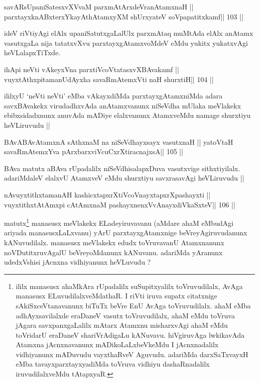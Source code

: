 \begin{shl}
savARsUpaniSatesxvXVvaM parxmAtArxdeVranAtamxnaH ||
parxtayxknABxterxYkayAthAtamxyXM shUrxyateV soVpapatitxkamf\hfill || 103 ||
\end{shl}

\begin{artha}
ideV riVtiyAgi elAlx upaniSatutxgaLalUlx parxmAtaq muMtAda elAlx anAtamx
vasutxgaLa nija tatatxvXvu parxtayxgAtamxvoMdeV eMdu yukitx yukatxvAgi heVLalapxTiTxde.
\end{artha}

\begin{shl}
ihApi neVti vAkeyxVna parxtiVcoV\s tatasxvXBAvakamf ||
vuyxtAthxpitamanUdAyx\s\s ha savaRmAtemxVti naH shurxtiH\hfill || 104 ||
\end{shl}

\begin{artha}
ililxyU `neVti neVti' eMba vAkayxdiMda parxtayxgAtamxniMda adara
savxBAvakekx virudadhxvAda anAtamxvanunx niSeVdha mUlaka meVlakekx
ebibxsidadxnunx anuvAda mADiye elalxvanunx AtamxveMdu namage shurxtiyu
heVLiruvudu ||
\end{artha}


\begin{shl}
BAvABAvAtamxnA sAthxnaM na niSeVdhayxsayx vasutxnaH ||
yatoV\s taH savaRmAtemxYva pArxbarxviVcuCxrXtiracnajxsA\hfill || 105 ||
\end{shl}

\begin{artha}
BAva matutx aBAva rUpadalilx niSeVdhisalapxDuva vasutxvige
sithxtiyilalx. adariMdaleV elalxvU AtamxveV eMdu shurxtiyu
savxrasavAgi heVLiruvudu ||
\end{artha}

\begin{shl}
nAvuyxtithxtamanAH kashicxtapxrXtiVcoV\s nayxtapxrXpashayxti ||
vuyxtithxtAtAmx\s pi cA\s\s tAmxnaM pashayxnenxVvAnayxdiVkaSxteV\hfill || 106 ||
\end{shl}

\begin{artha}
matutx\footnote[1]{ililx manasusx ahaMkAra rUpadalilx suSupitxyalilx
  toVruvudilalx, AvAga manasusx ELuvudilalxveMdathaR. I riVti iruva
  supatx citatxnige sAkiSxceVtanavanunx biTuTx beVre EnU
  AvAga toVruvudilalx. ahaM eMba adhAyxsavilalxde eraDaneV vasutx
  toVruvudilalx, ahaM eMdu toVruva jAgara savxpanxgaLalilx mAtarx
  Atamxnu misharxvAgi ahaM eMdu toVridarU eraDaneV shariVrAdigaLu
  kANuvavu. hiVgiruvAga lwkikavAda Atamxna jAcnxnavanunx
  mADikoLaLxbeVkeMdu I jAcnxnadalilx vidhiyanunx mADuvudu vayxthaRveV
  Aguvudu. adariMda darxSaTxvayxH eMba tavayxparxtayxyadiMda toVruva
  vidhiyu dashaRnadalilx iruvudilalxveMdu tAtapxyaR.} manasusx 
  meVlakekx ELadeyiruvavanu (aMdare ahaM eMbudAgi ariyada 
  manasusxLaLxvanu) yArU parxtayxgAtamxnige 
beVreyAgiruvudanunx kANuvudilalx. manasusx meVlakekx edudx toVruvavanU
Atamxnanunx noVDutitxruvAgalU beVreyoMdanunx kANuvanu. adariMda
yAranunx udedxVshisi jAcnxna vidhiyanunx heVLuvudu ?
\end{artha}

